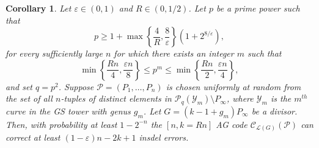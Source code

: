 \documentclass[10pt,a4paper]{amsart}
\newtheorem{corollary}{Corollary}
\begin{document}
\begin{corollary}
    Let $\varepsilon \in (0,1)$ and $R \in (0, 1/2)$. Let $p$ be a prime power such that 
    $$p \geq 1 + \max\left\lbrace \frac{4}{R}, \frac{8}{\varepsilon}\right\rbrace \left(1 +2^{8/\varepsilon}\right),$$
    for every sufficiently large $n$ for which there exists an integer $m$ such that $$ \min\left\lbrace \frac{Rn}{4}, \frac{\varepsilon n}{8}  \right\rbrace \leq p^m \leq \min\left\lbrace \frac{Rn}{2}, \frac{\varepsilon n}{4}\right\rbrace,$$
    and set $q = p^2$. 
    Suppose $\mathcal{P} = (P_1, \dots, P_n)$ is chosen uniformly at random from the set of all $n$-tuples of distinct elements in $\mathcal{P}_q(\mathcal{Y}_m) \setminus P_\infty$, where $\mathcal{Y}_m$ is the $m^{th}$ curve in the GS tower with genus $g_m$. Let $G = (k - 1 + g_m)P_{\infty}$ be a divisor. Then, with probability at least $1-2^{-n}$ the $[n, k = Rn]$ AG code $\mathcal{C}_{\mathcal{L}(G)}(\mathcal{P})$ can correct at least $(1-\varepsilon)n - 2k + 1$ insdel errors.
\end{corollary}
\end{document}
